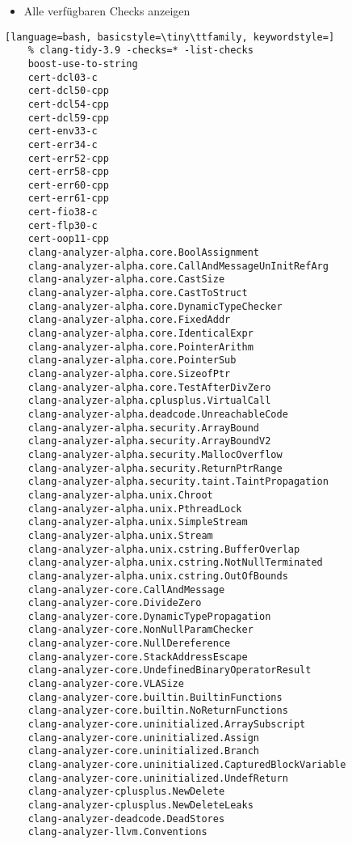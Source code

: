 \documentclass[aspectratio=169]{beamer}
\begin{document}
\begin{itemize}
\item Alle verfügbaren Checks anzeigen
\end{itemize}
\begin{lstlisting}[language=bash, basicstyle=\tiny\ttfamily, keywordstyle=]
    % clang-tidy-3.9 -checks=* -list-checks
    boost-use-to-string
    cert-dcl03-c
    cert-dcl50-cpp
    cert-dcl54-cpp
    cert-dcl59-cpp
    cert-env33-c
    cert-err34-c
    cert-err52-cpp
    cert-err58-cpp
    cert-err60-cpp
    cert-err61-cpp
    cert-fio38-c
    cert-flp30-c
    cert-oop11-cpp
    clang-analyzer-alpha.core.BoolAssignment
    clang-analyzer-alpha.core.CallAndMessageUnInitRefArg
    clang-analyzer-alpha.core.CastSize
    clang-analyzer-alpha.core.CastToStruct
    clang-analyzer-alpha.core.DynamicTypeChecker
    clang-analyzer-alpha.core.FixedAddr
    clang-analyzer-alpha.core.IdenticalExpr
    clang-analyzer-alpha.core.PointerArithm
    clang-analyzer-alpha.core.PointerSub
    clang-analyzer-alpha.core.SizeofPtr
    clang-analyzer-alpha.core.TestAfterDivZero
    clang-analyzer-alpha.cplusplus.VirtualCall
    clang-analyzer-alpha.deadcode.UnreachableCode
    clang-analyzer-alpha.security.ArrayBound
    clang-analyzer-alpha.security.ArrayBoundV2
    clang-analyzer-alpha.security.MallocOverflow
    clang-analyzer-alpha.security.ReturnPtrRange
    clang-analyzer-alpha.security.taint.TaintPropagation
    clang-analyzer-alpha.unix.Chroot
    clang-analyzer-alpha.unix.PthreadLock
    clang-analyzer-alpha.unix.SimpleStream
    clang-analyzer-alpha.unix.Stream
    clang-analyzer-alpha.unix.cstring.BufferOverlap
    clang-analyzer-alpha.unix.cstring.NotNullTerminated
    clang-analyzer-alpha.unix.cstring.OutOfBounds
    clang-analyzer-core.CallAndMessage
    clang-analyzer-core.DivideZero
    clang-analyzer-core.DynamicTypePropagation
    clang-analyzer-core.NonNullParamChecker
    clang-analyzer-core.NullDereference
    clang-analyzer-core.StackAddressEscape
    clang-analyzer-core.UndefinedBinaryOperatorResult
    clang-analyzer-core.VLASize
    clang-analyzer-core.builtin.BuiltinFunctions
    clang-analyzer-core.builtin.NoReturnFunctions
    clang-analyzer-core.uninitialized.ArraySubscript
    clang-analyzer-core.uninitialized.Assign
    clang-analyzer-core.uninitialized.Branch
    clang-analyzer-core.uninitialized.CapturedBlockVariable
    clang-analyzer-core.uninitialized.UndefReturn
    clang-analyzer-cplusplus.NewDelete
    clang-analyzer-cplusplus.NewDeleteLeaks
    clang-analyzer-deadcode.DeadStores
    clang-analyzer-llvm.Conventions

\end{lstlisting}
\end{document}
